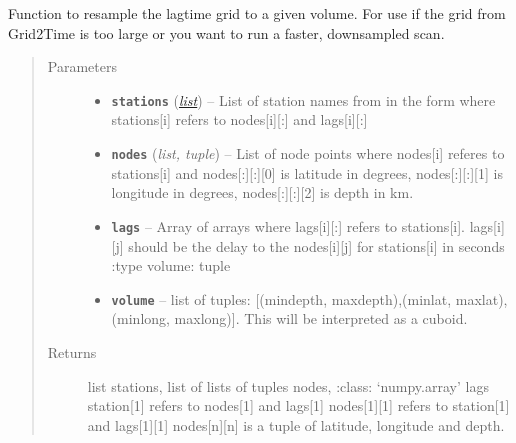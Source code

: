 \documentclass[a4paper,10pt,english]{sphinxmanual}
\begin{document}

\begin{fulllineitems}
\label{modules:bright_lights._resample_grid}
Function to resample the lagtime grid to a given volume.  For use if the
grid from Grid2Time is too large or you want to run a faster, downsampled
scan.
\begin{quote}\begin{description}
\item[{Parameters}] \leavevmode\begin{itemize}
\item {} 
\textbf{\texttt{stations}} (\href{https://docs.python.org/library/functions.html\#list}{\emph{list}}) -- List of station names from in the form where stations{[}i{]}    refers to nodes{[}i{]}{[}:{]} and lags{[}i{]}{[}:{]}

\item {} 
\textbf{\texttt{nodes}} (\emph{list, tuple}) -- List of node points where nodes{[}i{]} referes to stations{[}i{]} and    nodes{[}:{]}{[}:{]}{[}0{]} is latitude in degrees, nodes{[}:{]}{[}:{]}{[}1{]} is longitude in    degrees, nodes{[}:{]}{[}:{]}{[}2{]} is depth in km.

\item {} 
\textbf{\texttt{lags}} -- Array of arrays where lags{[}i{]}{[}:{]} refers to stations{[}i{]}.    lags{[}i{]}{[}j{]} should be the delay to the nodes{[}i{]}{[}j{]} for stations{[}i{]} in seconds    :type volume: tuple

\item {} 
\textbf{\texttt{volume}} -- list of tuples: {[}(mindepth, maxdepth),(minlat, maxlat),(minlong,    maxlong){]}.  This will be interpreted as a cuboid.

\end{itemize}

\item[{Returns}] \leavevmode
list stations, list of lists of tuples nodes, :class:     `numpy.array' lags station{[}1{]} refers to nodes{[}1{]} and lags{[}1{]}    nodes{[}1{]}{[}1{]} refers to station{[}1{]} and lags{[}1{]}{[}1{]}    nodes{[}n{]}{[}n{]} is a tuple of latitude, longitude and depth.

\end{description}\end{quote}

\end{fulllineitems}
\end{document}
